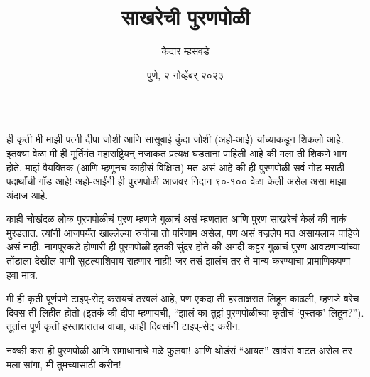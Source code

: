 \documentclass[17pt]{extarticle}  %
\begin{document}
\title{साखरेची पुरणपोळी}
\author{केदार म्हसवडे}
\date{पुणे, २ नोव्हेंबर् २०२३}
\maketitle
\hrule
\vspace{5mm}
ही कृती मी माझी पत्नी दीपा जोशी आणि सासूबाई कुंदा जोशी (अहो-आई) यांच्याकडून शिकलो आहे. इतक्या वेळा मी ही मूर्तिमंत महाराष्ट्रियन् नजाकत प्रत्यक्ष घडताना पाहिली आहे की मला ती शिकणे भाग होते. माझं वैयक्तिक (आणि म्हणूनच काहीसं विक्षिप्त) मत असं आहे की ही पुरणपोळी सर्व गोड मराठी पदार्थांची गॉड आहे! अहो-आईंनी ही पुरणपोळी आजवर निदान ९०-१०० वेळा केली असेल असा माझा अंदाज आहे. 

काही चोखंदळ लोक पुरणपोळीचं पुरण म्हणजे गुळाचं असं म्हणतात आणि पुरण साखरेचं केलं की नाकं मुरडतात. त्यांनी आजपर्यंत खाल्लेल्या रुचीचा तो परिणाम असेल, पण असं वज्रलेप मत असायलाच पाहिजे असं नाही. नागपूरकडे होणारी ही पुरणपोळी इतकी सुंदर होते की अगदी कट्टर गुळाचं पुरण आवडणाऱ्यांच्या तोंडाला देखील पाणी सुटल्याशिवाय राहणार नाही! जर तसं झालंच तर ते मान्य करण्याचा प्रामाणिकपणा हवा मात्र.

मी ही कृती पूर्णपणे टाइप्-सेट् करायचं ठरवलं आहे, पण एकदा ती हस्ताक्षरात लिहून काढली, म्हणजे बरेच दिवस ती लिहीत होतो (इतकं की दीपा म्हणायची, \enquote{झालं का तुझं पुरणपोळीच्या कृतीचं \enquote{पुस्तक} लिहून?}). तूर्तास पूर्ण कृती हस्ताक्षरातच वाचा, काही दिवसांनी टाइप्-सेट् करीन. 

नक्की करा ही पुरणपोळी आणि समाधानाचे मळे फुलवा! आणि थोडंसं \enquote{आयतं} खावंसं वाटत असेल तर मला सांगा, मी तुमच्यासाठी करीन!
\end{document}
